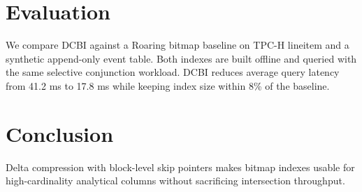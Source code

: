 \documentclass[11pt]{article}
\begin{document}
\section{Evaluation}
We compare DCBI against a Roaring bitmap baseline on TPC-H lineitem and a
synthetic append-only event table. Both indexes are built offline and queried
with the same selective conjunction workload. DCBI reduces average query
latency from 41.2 ms to 17.8 ms while keeping index size within 8\% of the
baseline.

\section{Conclusion}
Delta compression with block-level skip pointers makes bitmap indexes usable
for high-cardinality analytical columns without sacrificing intersection
throughput.
\end{document}
